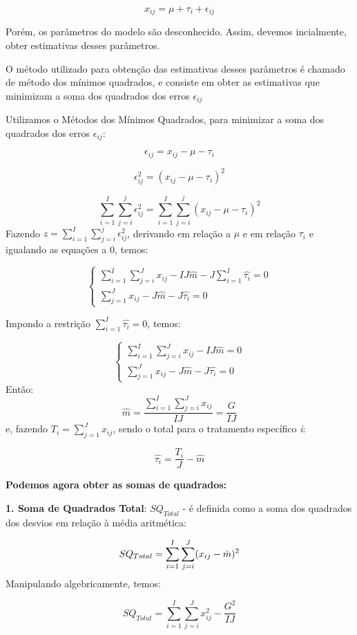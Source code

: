 \documentclass[
]{book}
\begin{document}
\[
x_{ij}= \mu + \tau_i + \epsilon_{ij}
\]

Porém, os parâmetros do modelo são desconhecido. Assim, devemos incialmente, obter estimativas desses parâmetros.

O método utilizado para obtenção das estimativas desses parâmetros é chamado de método dos mínimos quadrados, e consiste em obter as estimativas que minimizam a soma dos quadrados dos erros \(\epsilon_{ij}\)

Utilizamos o Métodos dos Mínimos Quadrados, para minimizar a soma dos quadrados dos erros \(\epsilon_{ij}\):

\[
\epsilon_{ij}= x_{ij} - \mu - \tau_i
\]

\[
\epsilon_{ij}^2= (x_{ij} - \mu - \tau_i)^2
\]

\[
\sum_{i=1}^I\sum_{j=i}^j\epsilon_{ij}^2=\sum_{i=1}^I\sum_{j=i}^j( x_{ij} - \mu - \tau_i)^2
\]
Fazendo \(z=\sum_{i=1}^I\sum_{j=i}^j\epsilon_{ij}^2\), derivando em relação a \(\mu\) e em relação \(\tau_i\) e igualando as equações a 0, temos:

\[
\begin{cases} \sum_{i=1}^I\sum_{j=i}^Jx_{ij} - IJ\hat{m} -J\sum_{i=1}^I \hat{\tau_i} =0 \\ \sum_{j=1}^Jx_{ij}-J\hat{m}-J\hat{\tau_i}=0 \end{cases}
\]

Impondo a restrição \(\sum_{i=1}^I \hat{\tau_i}=0\), temos:

\[
\begin{cases} \sum_{i=1}^I\sum_{j=i}^Jx_{ij} - IJ\hat{m} =0 \\ \sum_{j=1}^Jx_{ij}-J\hat{m}-J\hat{\tau_i}=0 \end{cases}
\]
Então:
\[
\hat{m} = \frac{\sum_{i=1}^I\sum_{j=i}^Jx_{ij}}{IJ}=\frac{G}{IJ}
\]
e, fazendo \(T_i=\sum_{j=1}^Jx_{ij}\), sendo o total para o tratamento específico \emph{i}:

\[
\hat{\tau_i} =\frac{T_i}{J} - \hat{m}
\]

\textbf{Podemos agora obter as somas de quadrados:}

\textbf{1. Soma de Quadrados Total}: \(SQ_{Total}\) - é definida como a soma dos quadrados dos desvios em relação à média aritmética:

\[
SQ_{Total} = \sum_{i=1}^I\sum_{j=i}^J(x_{ij} - \hat{m})^2 \\
\]
Manipulando algebricamente, temos:

\[
SQ_{Total} = \sum_{i=1}^I\sum_{j=i}^Jx_{ij}^2 - \frac{G^2}{IJ}
\]
\end{document}

